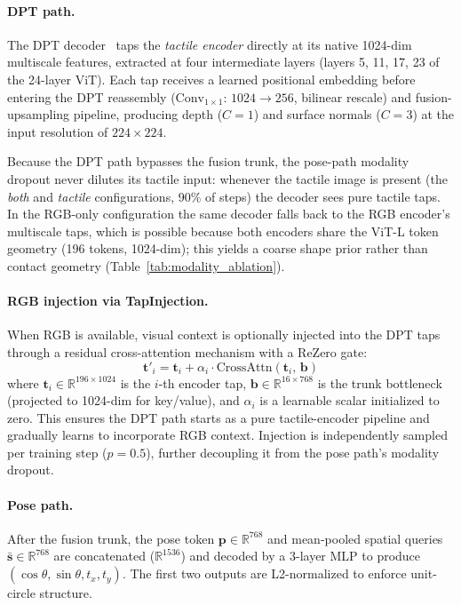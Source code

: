 \paragraph{DPT path.}
The DPT decoder~\cite{ranftl2021dpt} taps the \emph{tactile encoder}
directly at its native 1024-dim multiscale features, extracted at four
intermediate layers (layers 5, 11, 17, 23 of the 24-layer ViT). Each tap
receives a learned positional embedding before entering the DPT reassembly
($\text{Conv}_{1{\times}1}$: $1024 {\to} 256$, bilinear rescale) and
fusion-upsampling pipeline, producing depth ($C{=}1$) and surface normals
($C{=}3$) at the input resolution of $224{\times}224$.

Because the DPT path bypasses the fusion trunk, the pose-path modality
dropout never dilutes its tactile input: whenever the tactile image is
present (the \emph{both} and \emph{tactile} configurations, 90\% of steps)
the decoder sees pure tactile taps. In the RGB-only configuration the same
decoder falls back to the RGB encoder's multiscale taps, which is possible
because both encoders share the ViT-L token geometry (196 tokens, 1024-dim);
this yields a coarse shape prior rather than contact geometry
(Table~\ref{tab:modality_ablation}).

\paragraph{RGB injection via TapInjection.}
When RGB is available, visual context is optionally injected into the DPT taps
through a residual cross-attention mechanism with a ReZero gate:
\begin{equation}
  \mathbf{t}'_i = \mathbf{t}_i + \alpha_i \cdot
    \mathrm{CrossAttn}(\mathbf{t}_i,\, \mathbf{b})
  \label{eq:tap_inject}
\end{equation}
where $\mathbf{t}_i \in \mathbb{R}^{196 \times 1024}$ is the $i$-th encoder
tap, $\mathbf{b} \in \mathbb{R}^{16 \times 768}$ is the trunk bottleneck
(projected to 1024-dim for key/value), and $\alpha_i$ is a learnable scalar
initialized to zero. This ensures the DPT path starts as a pure
tactile-encoder pipeline and gradually learns to incorporate RGB context.
Injection is independently sampled per training step ($p = 0.5$), further
decoupling it from the pose path's modality dropout.

\paragraph{Pose path.}
After the fusion trunk, the pose token $\mathbf{p} \in \mathbb{R}^{768}$ and
mean-pooled spatial queries $\bar{\mathbf{s}} \in \mathbb{R}^{768}$ are
concatenated ($\mathbb{R}^{1536}$) and decoded by a 3-layer MLP to produce
$(\cos\theta, \sin\theta, t_x, t_y)$. The first two outputs are
L2-normalized to enforce unit-circle structure.

